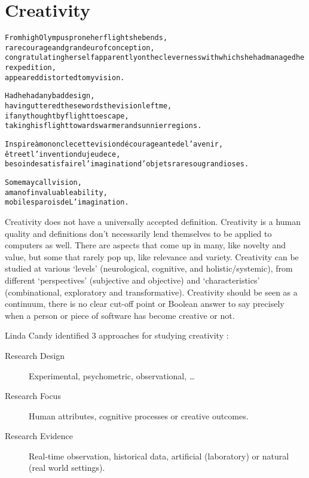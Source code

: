 
\chapter{Creativity}
\label{ch:creativity}

\startcontents[chapters]

\vfill

\begin{alltt}\sffamily
From high Olympus prone her flight she bends,
rare courage and grandeur of conception,
congratulating herself apparently on the cleverness with which she had managed her expedition,
appeared distorted to my vision.

Had he had any bad design,
having uttered these words the vision left me,
if any thought by flight to escape,
taking his flight towards warmer and sunnier regions.

Inspire à mon oncle cette vision décourageante de l'avenir,
être et l'invention du jeu de ce,
besoin de satisfaire l'imagination d'objets rares ou grandioses.

Some may call vision,
a man of invaluable ability,
mobiles parois de L'imagination.
\end{alltt}

\newpage
\minicontents
\spirals

Creativity does not have a universally accepted definition. Creativity is a human quality and definitions don't necessarily lend themselves to be applied to computers as well. There are aspects that come up in many, like novelty and value, but some that rarely pop up, like relevance and variety. Creativity can be studied at various `levels' (neurological, cognitive, and holistic/systemic), from different `perspectives' (subjective and objective) and `characteristics' (combinational, exploratory and transformative). Creativity should be seen as a continuum, there is no clear cut-off point or Boolean answer to say precisely when a person or piece of software has become creative or not.

Linda Candy identified 3 approaches for studying creativity \citeyear[p.3]{Candy2012}:

\begin{description}
  \item [Research Design] Experimental, psychometric, observational, \ldots
  \item [Research Focus] Human attributes, cognitive processes or creative outcomes.
  \item [Research Evidence] Real-time observation, historical data, artificial (laboratory) or natural (real world settings).
\end{description}

